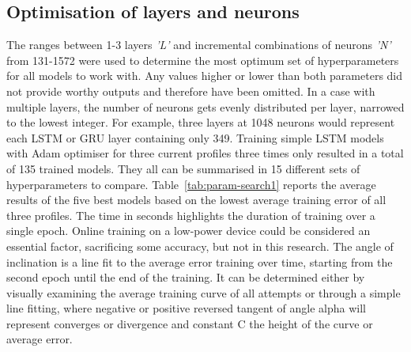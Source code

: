 %
%

\subsection{Optimisation of layers and neurons}
%
The ranges between 1-3 layers \textit{'L'} and incremental combinations of neurons \textit{'N'} from 131-1572 were used to determine the most optimum set of hyperparameters for all models to work with.
Any values higher or lower than both parameters did not provide worthy outputs and therefore have been omitted.
In a case with multiple layers, the number of neurons gets evenly distributed per layer, narrowed to the lowest integer.
For example, three layers at 1048 neurons would represent each LSTM or GRU layer containing only 349.
Training simple LSTM models with Adam optimiser for three current profiles three times only resulted in a total of 135 trained models.
They all can be summarised in 15 different sets of hyperparameters to compare.
\mbox{Table~\ref{tab:param-search1}} reports the average results of the five best models based on the lowest average training error of all three profiles.
The time in seconds highlights the duration of training over a single epoch.
Online training on a low-power device could be considered an essential factor, sacrificing some accuracy, but not in this research.
The angle of inclination is a line fit to the average error training over time, starting from the second epoch until the end of the training.
It can be determined either by visually examining the average training curve of all attempts or through a simple line fitting, where negative or positive reversed tangent of angle alpha will represent converges or divergence and constant C the height of the curve or average error.
